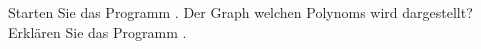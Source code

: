 \begin{aufg}[0]
Starten Sie das Programm
. Der Graph welchen Polynoms wird dargestellt?
Erklären Sie das Programm .
\end{aufg}